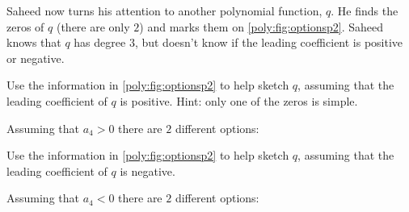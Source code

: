 \begin{exercises}
\begin{problem}
\begin{subproblem}
\begin{shortsolution}
		 \end{shortsolution}
	 \end{subproblem}
	 Saheed now turns his attention to another polynomial function, $q$. He finds
	 the zeros of $q$ (there are only $2$) and marks them on \cref{poly:fig:optionsp2}.
	 Saheed knows that $q$ has degree $3$, but doesn't know if the leading
	 coefficient is positive or negative.
	 \begin{subproblem}
		 Use the information in \cref{poly:fig:optionsp2} to help sketch $q$, assuming that the leading
		 coefficient of $q$ is positive. Hint: only one of the zeros is simple.
		 \begin{shortsolution}
			 Assuming that $a_4>0$ there are $2$ different options:

		 \end{shortsolution}
	 \end{subproblem}
	 \begin{subproblem}
		 Use the information in \cref{poly:fig:optionsp2} to help sketch $q$, assuming that the leading
		 coefficient of $q$ is negative.
		 \begin{shortsolution}
			 Assuming that $a_4<0$ there are $2$ different options:


\end{shortsolution}
\end{subproblem}
\end{problem}
\end{exercises}
